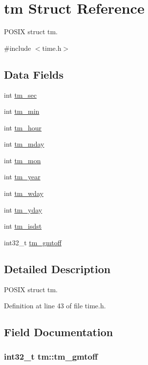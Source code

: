 \hypertarget{structtm}{\section{tm Struct Reference}
\label{structtm}
}


P\-O\-S\-I\-X struct tm.  




{\ttfamily \#include $<$time.\-h$>$}

\subsection*{Data Fields}
\begin{DoxyCompactItemize}
\item 
int \hyperlink{structtm_a4d098a9a5c03a00b2ee61e10851de81e}{tm\-\_\-sec}
\item 
int \hyperlink{structtm_af414eb7c86cc3099595211eee4d4211b}{tm\-\_\-min}
\item 
int \hyperlink{structtm_a3e7ca4e37f1abcaf56b8a916c38eb9fe}{tm\-\_\-hour}
\item 
int \hyperlink{structtm_ab8d8904bad43b0c8b96e61941c5b5310}{tm\-\_\-mday}
\item 
int \hyperlink{structtm_a112ac36fa2f593777138a417cf031e17}{tm\-\_\-mon}
\item 
int \hyperlink{structtm_a33adf78fd6476b2120ce3b9c4a852053}{tm\-\_\-year}
\item 
int \hyperlink{structtm_afe81a8c46f1c693c43f259b288859f4f}{tm\-\_\-wday}
\item 
int \hyperlink{structtm_a93a0ba77cc23796df84405dcbcc57eb1}{tm\-\_\-yday}
\item 
int \hyperlink{structtm_a5645ca0580c8ab2c24f6c2965d9c9f9c}{tm\-\_\-isdst}
\item 
int32\-\_\-t \hyperlink{structtm_a6b7d1fb16f21197ea027e364e2812c3d}{tm\-\_\-gmtoff}
\end{DoxyCompactItemize}


\subsection{Detailed Description}
P\-O\-S\-I\-X struct tm. 

Definition at line 43 of file time.\-h.



\subsection{Field Documentation}
\hypertarget{structtm_a6b7d1fb16f21197ea027e364e2812c3d}{
\subsubsection[{tm\-\_\-gmtoff}]{\setlength{\rightskip}{0pt plus 5cm}int32\-\_\-t tm\-::tm\-\_\-gmtoff}}\label{structtm_a6b7d1fb16f21197ea027e364e2812c3d}


